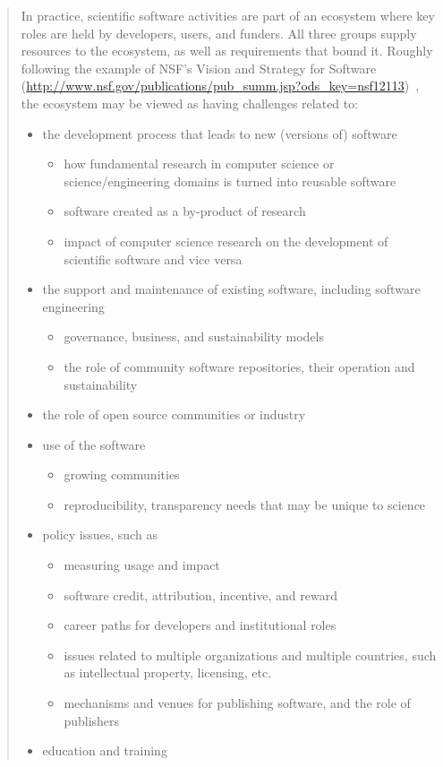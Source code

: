 \documentclass[11pt, oneside]{amsart}
\begin{document}
\begin{quote}
In practice, scientific software activities are part of an ecosystem
where key roles are held by developers, users, and funders. All three
groups supply resources to the ecosystem, as well as requirements that
bound it. Roughly following the example of NSF's Vision and Strategy
for Software
(\url{http://www.nsf.gov/publications/pub_summ.jsp?ods_key=nsf12113})~\cite{NSF_software_vision},
the ecosystem may be viewed as having challenges related to:

\begin{itemize}[leftmargin=0.2in]
\item the development process that leads to new (versions of) software
\begin{itemize}[leftmargin=0.2in]
\item how fundamental research in computer science or
  science/engineering domains is turned into reusable software
\item software created as a by-product of research
\item impact of computer science research on the development of
    scientific software and vice versa
\end{itemize}
\item the support and maintenance of existing software, including
  software engineering
\begin{itemize}[leftmargin=0.2in]
\item governance, business, and sustainability models
\item the role of community software repositories, their operation and
  sustainability
\end{itemize}
\item the role of open source communities or industry
\item use of the software
\begin{itemize}[leftmargin=0.2in]
\item growing communities
\item reproducibility, transparency needs that may be unique to science
\end{itemize}
\item policy issues, such as
\begin{itemize}[leftmargin=0.2in]
\item measuring usage and impact
\item software credit, attribution, incentive, and reward
\item career paths for developers and institutional roles
\item issues related to multiple organizations and multiple countries,
  such as intellectual property, licensing, etc.
\item mechanisms and venues for publishing software, and the role of
  publishers
\end{itemize}
\item education and training
\end{itemize}

\end{quote}
\end{document}
